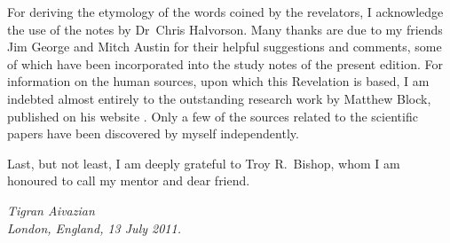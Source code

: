 \begin{center}
\end{center}

For deriving the etymology of the words coined by the revelators, I acknowledge the use of the notes by Dr~Chris Halvorson.
Many thanks are due to my friends Jim George and Mitch Austin for their helpful suggestions and comments,
some of which have been incorporated into the study notes of the present edition.
For information on the human sources, upon which this Revelation is based, I am indebted almost entirely to the outstanding
research work by Matthew Block, published on his website .
Only a few of the sources related to the scientific papers have been discovered by myself independently.

Last, but not least, I am deeply grateful to Troy R.~Bishop, whom I am honoured to call my mentor and dear friend.


\begin{flushleft}
\itshape
Tigran Aivazian\\
London, England, 13 July 2011.\\
\end{flushleft}
